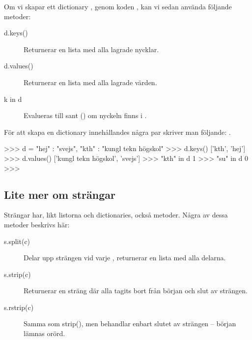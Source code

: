 \documentclass{beamer}
\begin{document}
\begin{frame}{\insertsubsectionhead}
  Om vi skapar ett dictionary , genom koden , kan vi 
  sedan använda följande metoder:

  \begin{description}
    \item[d.keys()] Returnerar en lista med alla lagrade nycklar.

    \item[d.values()] Returnerar en lista med alla lagrade värden.

    \item[k in d] Evalueras till sant () om nyckeln  finns 
      i .

  \end{description}

  För att skapa en dictionary innehållandes några par skriver man följande:
  .
\end{frame}

\begin{frame}[fragile]{\insertsubsectionhead}
  \begin{terminal}
>>> d = {"hej" : "svejs", "kth" : "kungl tekn högskol"}
>>> d.keys()
['kth', 'hej']
>>> d.values()
['kungl tekn högskol', 'svejs']
>>> "kth" in d
1
>>> "su" in d
0
>>>
  \end{terminal}
\end{frame}

\subsection{Lite mer om strängar}

\begin{frame}{\insertsubsectionhead}
  Strängar har, likt listorna och dictionaries, också metoder. Några av dessa
  metoder beskrivs här:

  \begin{description}
    \item[s.split(c)] Delar upp strängen vid varje , returnerar en 
      lista med alla delarna.

    \item[s.strip(c)] Returnerar en sträng där alla  tagits bort från 
      början och slut av strängen.

    \item[s.rstrip(c)] Samma som strip(), men behandlar enbart slutet av
      strängen -- början lämnas orörd.

  \end{description}
\end{frame}
\end{document}
